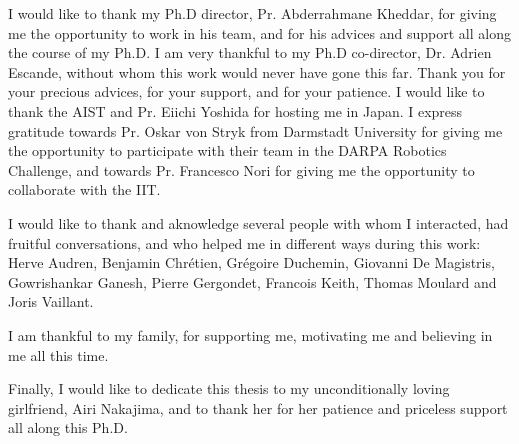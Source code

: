 
\begin{acknowledgements}

I would like to thank my Ph.D director, Pr. Abderrahmane Kheddar, for giving me the opportunity to work in his team, and for his advices and support all along the course of my Ph.D.
I am very thankful to my Ph.D co-director, Dr. Adrien Escande, without whom this work would never have gone this far.
Thank you for your precious advices, for your support, and for your patience.
I would like to thank the AIST and Pr. Eiichi Yoshida for hosting me in Japan.
I express gratitude towards Pr. Oskar von Stryk from Darmstadt University for giving me the opportunity to participate with their team in the DARPA Robotics Challenge, and towards Pr. Francesco Nori for giving me the opportunity to collaborate with the IIT.

I would like to thank and aknowledge several people with whom I interacted, had fruitful conversations, and who helped me in different ways during this work:
Herve Audren,
Benjamin Chr\'etien,
Gr\'egoire Duchemin,
Giovanni De Magistris,
Gowrishankar Ganesh,
Pierre Gergondet,
Francois Keith,
Thomas Moulard and
Joris Vaillant.

I am thankful to my family, for supporting me, motivating me and believing in me all this time.

Finally, I would like to dedicate this thesis to my unconditionally loving girlfriend, Airi Nakajima, and to thank her for her patience and priceless support all along this Ph.D.

\end{acknowledgements}
